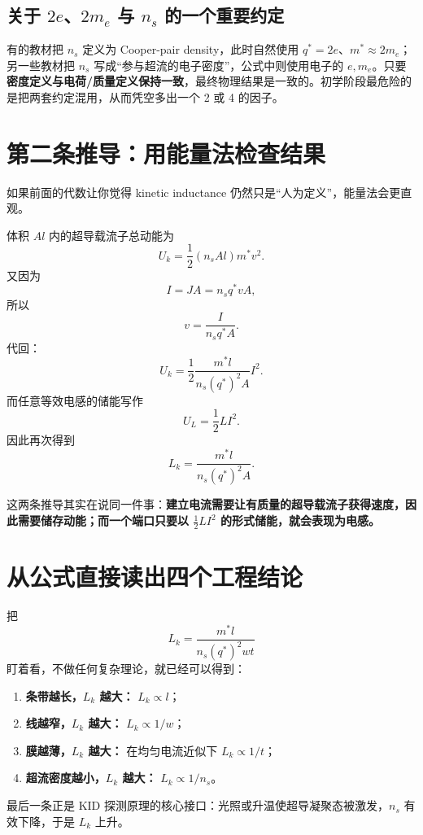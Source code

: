 \documentclass[11pt,a4paper,openany]{ctexrep}
\begin{document}
\subsection{关于 $2e$、$2m_e$ 与 $n_s$ 的一个重要约定}
有的教材把 $n_s$ 定义为 Cooper-pair density，此时自然使用 $q^*=2e$、$m^*\approx2m_e$；另一些教材把 $n_s$ 写成“参与超流的电子密度”，公式中则使用电子的 $e,m_e$。只要\textbf{密度定义与电荷/质量定义保持一致}，最终物理结果是一致的。初学阶段最危险的是把两套约定混用，从而凭空多出一个 2 或 4 的因子。

\section{第二条推导：用能量法检查结果}
如果前面的代数让你觉得 kinetic inductance 仍然只是“人为定义”，能量法会更直观。

体积 $Al$ 内的超导载流子总动能为
\[
U_k=\frac12(n_sAl)m^*v^2.
\]
又因为
\[
I=J A=n_sq^*vA,
\]
所以
\[
v=\frac{I}{n_sq^*A}.
\]
代回：
\[
U_k
=\frac12\frac{m^*l}{n_s(q^*)^2A}I^2.
\]
而任意等效电感的储能写作
\[
U_L=\frac12LI^2.
\]
因此再次得到
\[
\boxed{L_k=\frac{m^*l}{n_s(q^*)^2A}}.
\]

\begin{checkpointbox}
这两条推导其实在说同一件事：\textbf{建立电流需要让有质量的超导载流子获得速度，因此需要储存动能；而一个端口只要以 $\tfrac12LI^2$ 的形式储能，就会表现为电感。}
\end{checkpointbox}

\section{从公式直接读出四个工程结论}
把
\[
L_k=\frac{m^*l}{n_s(q^*)^2wt}
\]
盯着看，不做任何复杂理论，就已经可以得到：
\begin{enumerate}
  \item \textbf{条带越长，$L_k$ 越大：} $L_k\propto l$；
  \item \textbf{线越窄，$L_k$ 越大：} $L_k\propto1/w$；
  \item \textbf{膜越薄，$L_k$ 越大：} 在均匀电流近似下 $L_k\propto1/t$；
  \item \textbf{超流密度越小，$L_k$ 越大：} $L_k\propto1/n_s$。
\end{enumerate}
最后一条正是 KID 探测原理的核心接口：光照或升温使超导凝聚态被激发，$n_s$ 有效下降，于是 $L_k$ 上升。
\end{document}
